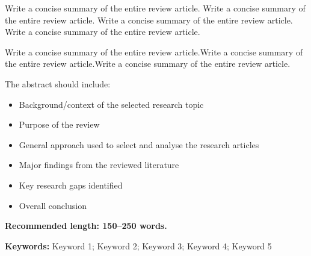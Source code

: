 \documentclass[12pt,a4paper]{article}
\begin{document}
\begin{justify}

Write a concise summary of the entire review article. Write a concise summary of the entire review article. Write a concise summary of the entire review article. Write a concise summary of the entire review article.

Write a concise summary of the entire review article.Write a concise summary of the entire review article.Write a concise summary of the entire review article.






The abstract should include:

\begin{itemize}
    \item Background/context of the selected research topic
    \item Purpose of the review
    \item General approach used to select and analyse the research articles
    \item Major findings from the reviewed literature
    \item Key research gaps identified
    \item Overall conclusion
\end{itemize}

\textbf{Recommended length: 150--250 words.}

\vspace{0.3cm}

\textbf{Keywords:} Keyword 1; Keyword 2; Keyword 3; Keyword 4; Keyword 5

\end{justify}





\newpage

\tableofcontents

\newpage



\end{document}
